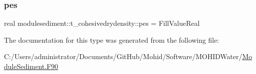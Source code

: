 \mbox{\label{structmodulesediment_1_1t__cohesivedrydensity_ad44fb1221a6767babe9ea42cf97069c3}} 
\subsubsection{\texorpdfstring{pes}{pes}}
{\footnotesize\ttfamily real modulesediment\+::t\+\_\+cohesivedrydensity\+::pes = Fill\+Value\+Real\hspace{0.3cm}{\ttfamily [private]}}



The documentation for this type was generated from the following file\+:\begin{DoxyCompactItemize}
\item 
C\+:/\+Users/administrator/\+Documents/\+Git\+Hub/\+Mohid/\+Software/\+M\+O\+H\+I\+D\+Water/\mbox{\hyperlink{_module_sediment_8_f90}{Module\+Sediment.\+F90}}\end{DoxyCompactItemize}
